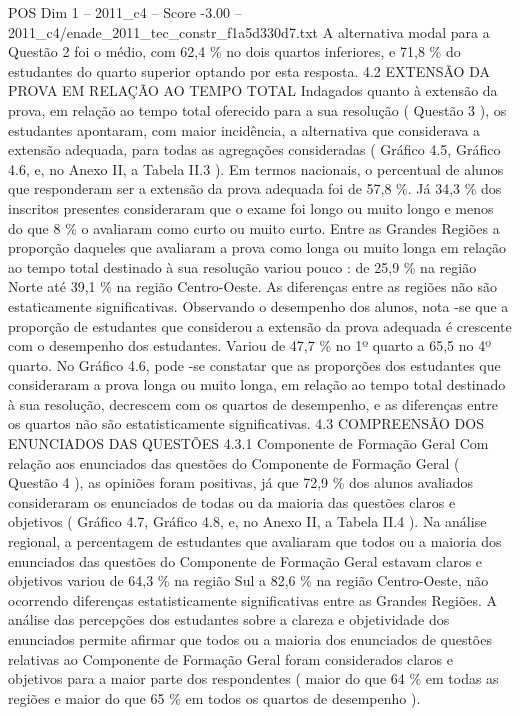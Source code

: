 \begin{textsample}{POS Dim 1 – 2011\_c4 – Score -3.00 – 2011\_c4/enade\_2011\_tec\_constr\_f1a5d330d7.txt}
A alternativa modal para a Questão 2 foi o médio, com 62,4 \% no dois quartos inferiores, e 71,8 \% do estudantes do quarto superior optando por esta resposta. 4.2 EXTENSÃO DA PROVA EM RELAÇÃO AO TEMPO TOTAL Indagados quanto à extensão da prova, em relação ao tempo total oferecido para a sua resolução ( Questão 3 ), os estudantes apontaram, com maior incidência, a alternativa que considerava a extensão adequada, para todas as agregações consideradas ( Gráfico 4.5, Gráfico 4.6, e, no Anexo II, a Tabela II.3 ).
Em termos nacionais, o percentual de alunos que responderam ser a extensão da prova adequada foi de 57,8 \%.
Já 34,3 \% dos inscritos presentes consideraram que o exame foi longo ou muito longo e menos do que 8 \% o avaliaram como curto ou muito curto.
Entre as Grandes Regiões a proporção daqueles que avaliaram a prova como longa ou muito longa em relação ao tempo total destinado à sua resolução variou pouco : de 25,9 \% na região Norte até 39,1 \% na região Centro-Oeste.
As diferenças entre as regiões não são estaticamente significativas.
Observando o desempenho dos alunos, nota -se que a proporção de estudantes que considerou a extensão da prova adequada é crescente com o desempenho dos estudantes.
Variou de 47,7 \% no 1º quarto a 65,5 no 4º quarto.
No Gráfico 4.6, pode -se constatar que as proporções dos estudantes que consideraram a prova longa ou muito longa, em relação ao tempo total destinado à sua resolução, decrescem com os quartos de desempenho, e as diferenças entre os quartos não são estatisticamente significativas. 4.3 COMPREENSÃO DOS ENUNCIADOS DAS QUESTÕES 4.3.1 Componente de Formação Geral Com relação aos enunciados das questões do Componente de Formação Geral ( Questão 4 ), as opiniões foram positivas, já que 72,9 \% dos alunos avaliados consideraram os enunciados de todas ou da maioria das questões claros e objetivos ( Gráfico 4.7, Gráfico 4.8, e, no Anexo II, a Tabela II.4 ).
Na análise regional, a percentagem de estudantes que avaliaram que todos ou a maioria dos enunciados das questões do Componente de Formação Geral estavam claros e objetivos variou de 64,3 \% na região Sul a 82,6 \% na região Centro-Oeste, não ocorrendo diferenças estatisticamente significativas entre as Grandes Regiões.
A análise das percepções dos estudantes sobre a clareza e objetividade dos enunciados permite afirmar que todos ou a maioria dos enunciados de questões relativas ao Componente de Formação Geral foram considerados claros e objetivos para a maior parte dos respondentes ( maior do que 64 \% em todas as regiões e maior do que 65 \% em todos os quartos de desempenho ).

\end{textsample}
